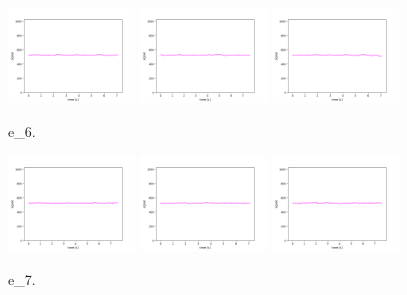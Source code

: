 \begin{figure}[!ht]
\begin{center}
\includegraphics[width=0.3\textwidth]{../data/e_6/e_6_1.png}
\includegraphics[width=0.3\textwidth]{../data/e_6/e_6_2.png}
\includegraphics[width=0.3\textwidth]{../data/e_6/e_6_3.png}
\caption{e\_6.\label{fig:e_6}}
\end{center}
\end{figure}

\begin{figure}[!ht]
\begin{center}
\includegraphics[width=0.3\textwidth]{../data/e_7/e_7_1.png}
\includegraphics[width=0.3\textwidth]{../data/e_7/e_7_2.png}
\includegraphics[width=0.3\textwidth]{../data/e_7/e_7_3.png}
\caption{e\_7.\label{fig:e_7}}
\end{center}
\end{figure}

